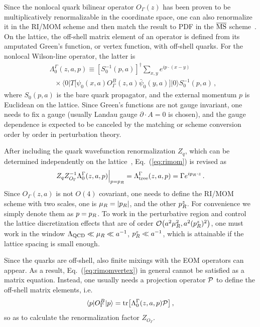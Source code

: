 \documentclass[aps,rmp,reprint,amsmath,amssymb,graphicx,longbibliography]{revtex4-1} %
\newcommand{\MS}{{\overline{\rm MS}}}
\newcommand{\nn}{\nonumber}
\DeclareRobustCommand{\eq}[1]{Eq.~(\ref{eq:#1})}
\begin{document}
Since the nonlocal quark bilinear operator $O_\Gamma(z)$ has been proven to be multiplicatively renormalizable in the coordinate space, one can also renormalize it in the RI/MOM scheme and then match the result to PDF in the $\MS$ scheme~\cite{Constantinou:2017sej,Stewart:2017tvs}.
On the lattice, the off-shell matrix element of an operator is defined from its amputated Green's function, or vertex function, with off-shell quarks. For the nonlocal Wilson-line operator, the latter is
\begin{align} \label{eq:Lambda}
	&\Lambda^{\Gamma}_0(z, a, p) \equiv
	\left[S^{-1}_0(p,a)\right]^\dagger \sum_{x,y}e^{ip\cdot (x-y)}
	\nn\\
	&\ \ \  \times\! \big\langle 0 \big|T\bigl[\psi_0(x,a) O^B_\Gamma(z,a) \bar{\psi}_0(y,a)\bigr]\big|0\big\rangle S^{-1}_0(p,a)\,,
\end{align}
where $S_0(p,a)$ is the bare quark propagator, and the external momentum $p$ is Euclidean on the lattice.
Since Green's functions are not gauge invariant, one needs to fix a gauge (usually Landau gauge $\partial\cdot  A=0$ is chosen), and the gauge dependence is expected to be canceled by the matching or scheme conversion order by order in perturbation theory.

After including the quark wavefunction renormalization $Z_q$, which can be determined independently on the lattice~\cite{Martinelli:1994ty}, \eq{rimom} is revised as
\begin{align} \label{eq:rimomvertex}
	Z_q Z^{-1}_{O_\Gamma} \Lambda^{\Gamma}_0(z,a,p)\Big|_{p=p_{\tiny R}}= \Lambda^{\Gamma}_{\rm tree}(z,a,p) = \Gamma e^{ip_{\tiny R}\cdot z}\,.
\end{align}
Since $O_\Gamma(z,a)$ is not $O(4)$ covariant, one needs to define the RI/MOM scheme with two scales, one is $\mu_{\tiny R}=|p_R|$, and the other $p_{\tiny R}^z$. For convenience we simply denote them as $p=p_{\tiny R}$. To work in the perturbative region and control the lattice discretization effects that are of order ${\cal O}\big(a^2\mu_{\tiny R}^2, a^2(p_{\tiny R}^z)^2\big)$, one must work in the window $\Lambda_{\rm QCD}\ll \mu_{\tiny R}\ll a^{-1}$, $p_{\tiny R}^z \ll a^{-1}$, which is attainable if the lattice spacing is small enough.

Since the quarks are off-shell, also finite mixings with the EOM operators can appear. As a result, \eq{rimomvertex} in general cannot be satisfied as a matrix equation. Instead, one usually needs a projection operator ${\cal P}$ to define the off-shell matrix elements, i.e.
\begin{align}
	\langle p| O^B_\Gamma |p\rangle = {\rm tr}\big[\Lambda^{\Gamma}_0(z,a,p) {\cal P}\big]\,,
\end{align}
so as to calculate the renormalization factor $Z_{O_\Gamma}$.
\end{document}
